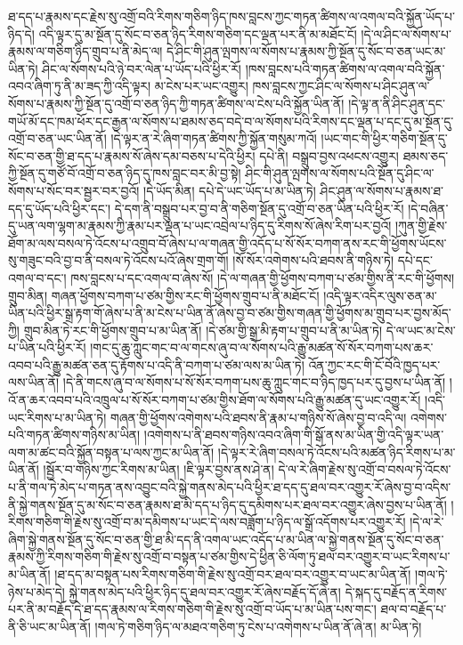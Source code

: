 ཐ་དད་པ་རྣམས་དང་རྗེས་སུ་འགྲོ་བའི་རིགས་གཅིག་ཉིད་ཁས་བླངས་ཀྱང་གཏན་ཚིགས་ལ་འགལ་བའི་སྐྱོན་ཡོད་པ་ཉིད་དེ། འདི་ལྟར་དུ་མ་སྔོན་དུ་སོང་བ་ཅན་ཉིད་རིགས་གཅིག་དང་ལྡན་པར་ནི་མ་མཐོང་ངོ། །དེ་ལ་ཤིང་ལ་སོགས་པ་རྣམས་ལ་གཅིག་ཉིད་གྲུབ་པ་ནི་མེད་ལ། དེ་ཤིང་གི་ཤུན་ལྤགས་ལ་སོགས་པ་རྣམས་ཀྱི་སྔོན་དུ་སོང་བ་ཅན་ཡང་མ་ཡིན་ཏེ། ཤིང་ལ་སོགས་པའི་ཉེ་བར་ལེན་པ་ཡོད་པའི་ཕྱིར་རོ། །ཁས་བླངས་པའི་གཏན་ཚིགས་ལ་འགལ་བའི་སྐྱོན་འབའ་ཞིག་ཏུ་ནི་མ་ཟད་ཀྱི་འདི་ལྟར། མ་ངེས་པར་ཡང་འགྱུར། ཁས་བླངས་ཀྱང་ཤིང་ལ་སོགས་པ་ཤིང་ཤུན་ལ་སོགས་པ་རྣམས་ཀྱི་སྔོན་དུ་འགྲོ་བ་ཅན་ཉིད་ཀྱི་གཏན་ཚིགས་ལ་ངེས་པའི་སྐྱོན་ཡིན་ནོ། །དེ་ལྟ་ན་ནི་ཤིང་ཤུན་དང་གཡོ་མོ་དང་ཁམ་ཕོར་དང་རྒྱན་ལ་སོགས་པ་ཐམས་ཅད་བདེ་བ་ལ་སོགས་པའི་རིགས་དང་ལྡན་པ་དང་དུ་མ་སྔོན་དུ་འགྲོ་བ་ཅན་ཡང་ཡིན་ནོ། །དེ་ལྟར་ན་རེ་ཞིག་གཏན་ཚིགས་ཀྱི་སྐྱོན་གསུམ་ཀའོ། །ཡང་གང་གི་ཕྱིར་གཅིག་སྔོན་དུ་སོང་བ་ཅན་གྱི་ཐ་དད་པ་རྣམས་སོ་ཞེས་དམ་བཅས་པ་དེའི་ཕྱིར། དཔེ་ནི། བསྒྲུབ་བྱས་འཕངས་འགྱུར། ཐམས་ཅད་ཀྱི་སྔོན་དུ་གཙོ་བོ་འགྲོ་བ་ཅན་ཉིད་དུ་ཁས་བླང་བར་མི་བྱ་སྟེ། ཤིང་གི་ཤུན་ལྤགས་ལ་སོགས་པའི་སྔོན་དུ་ཤིང་ལ་སོགས་པ་སོང་བར་སྦྱར་བར་བྱའོ། །དེ་ཡོད་མིན། དཔེ་དེ་ཡང་ཡོད་པ་མ་ཡིན་ཏེ། ཤིང་ཤུན་ལ་སོགས་པ་རྣམས་ཐ་དད་དུ་ཡོད་པའི་ཕྱིར་དང་། དེ་དག་ནི་བསྒྲུབ་པར་བྱ་བ་ནི་གཅིག་སྔོན་དུ་འགྲོ་བ་ཅན་ཡིན་པའི་ཕྱིར་རོ། །དེ་བཞིན་དུ་ཡན་ལག་ལྷག་མ་རྣམས་ཀྱི་རྣམ་པར་ལྡན་པ་ཡང་འབྲེལ་པ་ཉིད་དུ་རིགས་སོ་ཞེས་རིག་པར་བྱའོ། །ཀུན་གྱི་རྗེས་ཐོག་མ་ལས་བསལ་ཏེ་འོངས་པ་འགྲུབ་བོ་ཞེས་པ་ལ་གཞན་གྱི་འདོད་པ་སོ་སོར་བཀག་ནས་རང་གི་ཕྱོགས་ཡོངས་སུ་གཟུང་བའི་བྱ་བ་ནི་བསལ་ཏེ་འོངས་པའོ་ཞེས་གྲག་གོ། །སོ་སོར་འགེགས་པའི་ཐབས་ནི་གཉིས་ཏེ། དཔེ་དང་འགལ་བ་དང་། ཁས་བླངས་པ་དང་འགལ་བ་ཞེས་སོ། །དེ་ལ་གཞན་གྱི་ཕྱོགས་བཀག་པ་ཙམ་གྱིས་ནི་རང་གི་ཕྱོགས། གྲུབ་མིན། གཞན་ཕྱོགས་བཀག་པ་ཙམ་གྱིས་རང་གི་ཕྱོགས་གྲུབ་པ་ནི་མཐོང་ངོ། །འདི་ལྟར་འདིར་ལུས་ཅན་མ་ཡིན་པའི་ཕྱིར་སྒྲ་རྟག་གོ་ཞེས་པ་ནི་མ་ངེས་པ་ཡིན་ནོ་ཞེས་བྱ་བ་ཙམ་གྱིས་གཞན་གྱི་ཕྱོགས་མ་གྲུབ་པར་བྱས་མོད་ཀྱི། གྲུབ་མིན་ཏེ་རང་གི་ཕྱོགས་གྲུབ་པ་མ་ཡིན་ནོ། །དེ་ཙམ་གྱི་སྒྲ་མི་རྟག་པ་གྲུབ་པ་ནི་མ་ཡིན་ཏེ། དེ་ལ་ཡང་མ་ངེས་པ་ཡིན་པའི་ཕྱིར་རོ། །གང་དུ་ཆུ་ཀླུང་གང་བ་ལ་གངས་ཞུ་བ་ལ་སོགས་པའི་རྒྱུ་མཚན་སོ་སོར་བཀག་པས་ཆར་འབབ་པའི་རྒྱུ་མཚན་ཅན་དུ་རྟོགས་པ་འདི་ནི་བཀག་པ་ཙམ་ལས་མ་ཡིན་ཏེ། འོན་ཀྱང་རང་གི་ངོ་བོའི་ཁྱད་པར་ལས་ཡིན་ནོ། །དེ་ནི་གངས་ཞུ་བ་ལ་སོགས་པ་སོ་སོར་བཀག་པས་ཆུ་ཀླུང་གང་བ་ཉིད་ཁྱད་པར་དུ་བྱས་པ་ཡིན་ནོ། །འོ་ན་ཆར་འབབ་པའི་འཁྲུལ་པ་སོ་སོར་བཀག་པ་ཙམ་གྱིས་ཐོག་ལ་སོགས་པའི་རྒྱུ་མཚན་དུ་ཡང་འགྱུར་རོ། །འདི་ཡང་རིགས་པ་མ་ཡིན་ཏེ། གཞན་གྱི་ཕྱོགས་འགེགས་པའི་ཐབས་ནི་རྣམ་པ་གཉིས་སོ་ཞེས་བྱ་བ་འདི་ལ། འགེགས་པའི་གཏན་ཚིགས་གཉིས་མ་ཡིན། །འགེགས་པ་ནི་ཐབས་གཉིས་འབའ་ཞིག་གི་སྒོ་ནས་མ་ཡིན་གྱི་འདི་ལྟར་ཡན་ལག་མ་ཚང་བའི་སྐྱོན་བསྟན་པ་ལས་ཀྱང་མ་ཡིན་ནོ། །དེ་ལྟར་རེ་ཞིག་བསལ་ཏེ་འོངས་པའི་མཚན་ཉིད་རིགས་པ་མ་ཡིན་ནོ། །སྦྱོར་བ་གཉིས་ཀྱང་རིགས་མ་ཡིན། །ཇི་ལྟར་བྱས་ནས་ཤེ་ན། དེ་ལ་རེ་ཞིག་རྗེས་སུ་འགྲོ་བ་བསལ་ཏེ་འོངས་པ་ནི་གལ་ཏེ་མེད་པ་གཏན་ནས་འབྱུང་བའི་སྐྱེ་གནས་མེད་པའི་ཕྱིར་ཐ་དད་དུ་ཐལ་བར་འགྱུར་རོ་ཞེས་བྱ་བ་འདིས་ནི་སྐྱེ་གནས་སྔོན་དུ་མ་སོང་བ་ཅན་རྣམས་ཐ་མི་དད་པ་ཉིད་དུ་དམིགས་པར་ཐལ་བར་འགྱུར་ཞེས་བྱས་པ་ཡིན་ནོ། །རིགས་གཅིག་གི་རྗེས་སུ་འགྲོ་བ་མ་དམིགས་པ་ཡང་དེ་ལས་བཟློག་པ་ཉིད་ལ་སྒྲོ་འདོགས་པར་འགྱུར་རོ། །དེ་ལ་རེ་ཞིག་སྐྱེ་གནས་སྔོན་དུ་སོང་བ་ཅན་གྱི་ཐ་མི་དད་ནི་འགལ་ཡང་འདོད་པ་མ་ཡིན་ལ་སྐྱེ་གནས་སྔོན་དུ་སོང་བ་ཅན་རྣམས་ཀྱི་རིགས་གཅིག་གི་རྗེས་སུ་འགྲོ་བ་བསྟན་པ་ཙམ་གྱིས་དེ་ཕྱིན་ཅི་ལོག་ཏུ་ཐལ་བར་འགྱུར་བ་ཡང་རིགས་པ་མ་ཡིན་ནོ། །ཐ་དད་མ་བསྟན་པས་རིགས་གཅིག་གི་རྗེས་སུ་འགྲོ་བར་ཐལ་བར་འགྱུར་བ་ཡང་མ་ཡིན་ནོ། །གལ་ཏེ་ཉེས་པ་མེད་དེ། སྐྱེ་གནས་མེད་པའི་ཕྱིར་ཉིད་དུ་ཐལ་བར་འགྱུར་རོ་ཞེས་བརྗོད་དོ་ཞེ་ན། དེ་སྐད་དུ་བརྗོད་ན་རིགས་པར་ནི་མ་བརྗོད་དེ་ཐ་དད་རྣམས་ལ་རིགས་གཅིག་གི་རྗེས་སུ་འགྲོ་བ་ཡོད་པ་མ་ཡིན་པས་གང་། ཐལ་བ་བརྗོད་པ་ནི་ཅི་ཡང་མ་ཡིན་ནོ། །གལ་ཏེ་གཅིག་ཉིད་ལ་མཐའ་གཅིག་ཏུ་ངེས་པ་འགེགས་པ་ཡིན་ནོ་ཞེ་ན། མ་ཡིན་ཏེ། 
